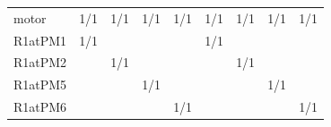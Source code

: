 \begin{table}[H]
{\begin{tabular}{l|llllllll}
			motor    & 1/1       & 1/1       & 1/1       & 1/1       & 1/1       & 1/1       & 1/1       & 1/1       \\
			R1atPM1  & 1/1       &           &           &           & 1/1       &           &           &           \\
			R1atPM2  &           & 1/1       &           &           &           & 1/1       &           &           \\
			R1atPM5  &           &           & 1/1       &           &           &           & 1/1       &           \\
			R1atPM6  &           &           &           & 1/1       &           &           &           & 1/1       \\
			\bottomrule
		\end{tabular}
	}
\end{table}

